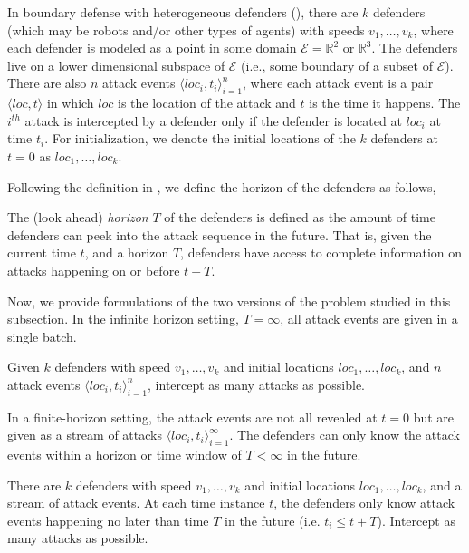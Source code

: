 In boundary defense with heterogeneous defenders (\prob), there are $k$ defenders (which may be robots and/or other types of agents) with speeds $v_1,\dots,v_k$, where each defender is modeled as a point in some domain $\mathcal E = \mathbb R^2$ or $\mathbb R^3$.
The defenders live on a lower dimensional subspace of $\mathcal E$ (i.e., some boundary of a subset of $\mathcal E$).  
There are also $n$ attack events $\big\langle loc_i, t_i\big\rangle_{i=1}^{n}$, where each attack event is a pair $\big\langle loc, t\big\rangle$ in which $loc$ is the
location of the attack and $t$ is the time it happens. 
The $i^{{th}}$ attack is intercepted by a defender only if the defender is located at $loc_i$ at time $t_i$.
For initialization, we denote the initial locations of the $k$ defenders at $t=0$ as $loc_{1},\dots, loc_{k}$. 

Following the definition in \cite{adler2022role}, we define the horizon of the defenders as follows,
\begin{definition}[Horizon]
The (look ahead) \textit{horizon} $T$ of the defenders is defined as the amount of time defenders can peek into the attack sequence in the future. That is, given the current time $t$, and a horizon $T$, defenders have access to complete information on attacks happening on or before $t+T$. 
\end{definition}

Now, we provide formulations of the two versions of the \prob problem studied in this subsection. In the infinite horizon setting, $T = \infty$, all attack events are given in a single batch.

\begin{problem}\label{prob:bd-1}
Given $k$ defenders with speed $v_1, \dots, v_k$ and initial locations $loc_1, \ldots, loc_k$, and $n$ attack events $\big\langle loc_i, t_i\big\rangle_{i=1}^{n}$, intercept as many attacks as possible. 
\end{problem}

In a finite-horizon setting, the attack events are not all revealed at $t=0$ but are given as a stream of attacks $\big\langle loc_i, t_i\big\rangle_{i=1}^{\infty}$. The defenders can only know the attack events within a horizon or time window of $T < \infty$ in the future.

\begin{problem}\label{prob:bd-2}
There are $k$ defenders with speed $v_1, \dots, v_k$ and initial locations $loc_1, \ldots, loc_k$, and a stream of attack events.
%
At each time instance $t$, the defenders only know attack events happening no later than time $T$ in the future (i.e. $t_i \le t+T$).
%
Intercept as many attacks as possible. 
\end{problem}

